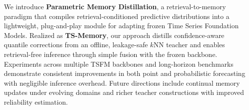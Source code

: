 

We introduce \textbf{Parametric Memory Distillation}, a retrieval-to-memory paradigm that compiles retrieval-conditioned predictive distributions into a lightweight, plug-and-play module for adapting frozen Time Series Foundation Models. Realized as \textbf{TS-Memory}, our approach distills confidence-aware quantile corrections from an offline, leakage-safe $k$NN teacher and enables retrieval-free inference through simple fusion with the frozen backbone. Experiments across multiple TSFM backbones and long-horizon benchmarks demonstrate consistent improvements in both point and probabilistic forecasting with negligible inference overhead. Future directions include continual memory updates under evolving domains and richer teacher constructions with improved reliability estimation.

